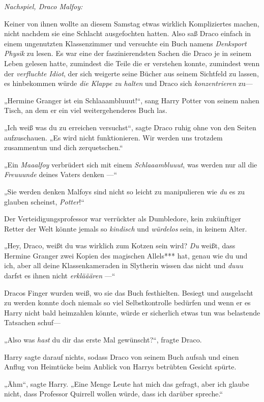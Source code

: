 {\emph{Nachspiel, Draco Malfoy:}

Keiner von ihnen wollte an diesem Samstag etwas wirklich Kompliziertes machen, nicht nachdem sie eine Schlacht ausgefochten hatten. Also saß Draco einfach in einem ungenutzten Klassenzimmer und versuchte ein Buch namens \emph{Denksport Physik} zu lesen. Es war eine der faszinierendsten Sachen die Draco je in seinem Leben gelesen hatte, zumindest die Teile die er verstehen konnte, zumindest wenn der \emph{verfluchte Idiot}, der sich weigerte seine Bücher aus seinem Sichtfeld zu lassen, es hinbekommen würde \emph{die Klappe zu halten} und Draco sich \emph{konzentrieren} zu—

„Hermine Granger ist ein Schlaaambluuut!“, sang Harry Potter von seinem nahen Tisch, an dem er ein viel weitergehenderes Buch las.

„Ich weiß was du zu erreichen versuchst“, sagte Draco ruhig ohne von den Seiten aufzuschauen. „Es wird nicht funktionieren. Wir werden uns trotzdem zusammentun und dich zerquetschen.“

„Ein \emph{Maaalfoy} verbrüdert sich mit einem \emph{Schlaaambluuut}, was werden nur all die \emph{Freuuunde} deines Vaters denken —“

„Sie werden denken Malfoys sind nicht so leicht zu manipulieren wie \emph{du} es zu glauben scheinst, \emph{Potter}!“

Der Verteidigungsprofessor war verrückter als Dumbledore, kein zukünftiger Retter der Welt könnte jemals so \emph{kindisch} und \emph{würdelos} sein, in keinem Alter.

„Hey, Draco, weißt du was wirklich zum Kotzen sein wird? \emph{Du} weißt, dass Hermine Granger zwei Kopien des magischen Allels*** hat, genau wie du und ich, aber all deine Klassenkameraden in Slytherin wissen das nicht und \emph{duuu} darfst es ihnen nicht \emph{erklääären} —“

Dracos Finger wurden weiß, wo sie das Buch festhielten. Besiegt und ausgelacht zu werden konnte doch niemals so viel Selbstkontrolle bedürfen und wenn er es Harry nicht bald heimzahlen könnte, würde er sicherlich etwas tun was belastende Tatsachen schuf—

„Also was \emph{hast} du dir das erste Mal gewünscht?“, fragte Draco.

Harry sagte darauf nichts, sodass Draco von seinem Buch aufsah und einen Anflug von Heimtücke beim Anblick von Harrys betrübten Gesicht spürte.

„Ähm“, sagte Harry. „Eine Menge Leute hat mich das gefragt, aber ich glaube nicht, dass Professor Quirrell wollen würde, dass ich darüber spreche.“

}
